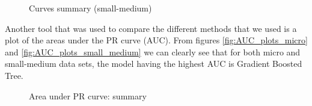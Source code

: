 \documentclass[LaM,binding=0.6cm, english]{sapthesis}
\begin{document}
\begin{figure}[!ht]
  \centering
  \hfill
  \caption{Curves summary (small-medium)}
\end{figure}

Another tool that was used to compare the different methods that we used is a plot of the areas under the PR curve (AUC). From figures \ref{fig:AUC_plots_micro} and \ref{fig:AUC_plots_small_medium} we can clearly see that for both micro and small-medium data sets, the model having the highest AUC is Gradient Boosted Tree.

\begin{figure}[!ht]
  \centering
  \hfill
  \caption{Area under PR curve: summary}
\end{figure}
\end{document}
